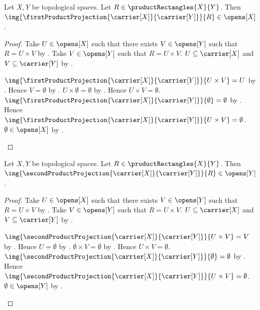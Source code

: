 \begin{proposition}\label{first_projection_image_product_rectangle_open}
    Let $X,Y$ be topological spaces.
    Let $R\in\productRectangles{X}{Y}$.
    Then
        $\img{\firstProductProjection{
            \carrier[X]}{\carrier[Y]}}{R}\in\opens[X]$.
\end{proposition}
\begin{proof}
    Take $U\in\opens[X]$ such that there exists $V\in\opens[Y]$
        such that $R=U\times V$ by .
    Take $V\in\opens[Y]$ such that $R=U\times V$.
    $U\subseteq\carrier[X]$ and $V\subseteq\carrier[Y]$ by
        .
    \begin{byCase}
            $\img{\firstProductProjection{
                \carrier[X]}{\carrier[Y]}}{U\times V}=U$ by
                .
            Hence $V=\emptyset$ by .
            $U\times\emptyset=\emptyset$ by .
            Hence $U\times V=\emptyset$.
            $\img{\firstProductProjection{
                \carrier[X]}{\carrier[Y]}}{\emptyset}=\emptyset$ by
                .
            Hence $\img{\firstProductProjection{
                \carrier[X]}{\carrier[Y]}}{U\times V}=\emptyset$.
            $\emptyset\in\opens[X]$ by .
    \end{byCase}
\end{proof}

\begin{proposition}\label{second_projection_image_product_rectangle_open}
    Let $X,Y$ be topological spaces.
    Let $R\in\productRectangles{X}{Y}$.
    Then
        $\img{\secondProductProjection{
            \carrier[X]}{\carrier[Y]}}{R}\in\opens[Y]$.
\end{proposition}
\begin{proof}
    Take $U\in\opens[X]$ such that there exists $V\in\opens[Y]$
        such that $R=U\times V$ by .
    Take $V\in\opens[Y]$ such that $R=U\times V$.
    $U\subseteq\carrier[X]$ and $V\subseteq\carrier[Y]$ by
        .
    \begin{byCase}
            $\img{\secondProductProjection{
                \carrier[X]}{\carrier[Y]}}{U\times V}=V$ by
                .
            Hence $U=\emptyset$ by .
            $\emptyset\times V=\emptyset$ by .
            Hence $U\times V=\emptyset$.
            $\img{\secondProductProjection{
                \carrier[X]}{\carrier[Y]}}{\emptyset}=\emptyset$ by
                .
            Hence $\img{\secondProductProjection{
                \carrier[X]}{\carrier[Y]}}{U\times V}=\emptyset$.
            $\emptyset\in\opens[Y]$ by .
    \end{byCase}
\end{proof}

